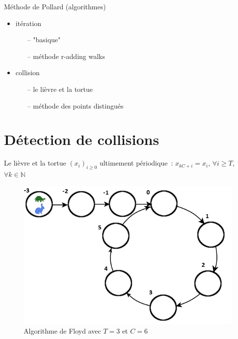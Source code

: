 \documentclass{beamer}
\begin{document}
  \begin{frame}{Méthode de Pollard (algorithmes)}
    \begin{itemize}
      \item itération
        \begin{itemize}
          \item[--] "basique"
          \item[--] méthode r-adding walks
        \end{itemize}
      \item collision
        \begin{itemize}
          \item[--] le lièvre et la tortue
          \item[--] méthode des points distingués
        \end{itemize}
    \end{itemize}
  \end{frame}


  \section{Détection de collisions}

  \begin{frame}{Le lièvre et la tortue}
    $(x_i)_{i \ge 0}$ ultimement périodique~: $x_{kC+i} = x_i$, $\forall i \geq T$, $\forall k \in \mathbb{N}$
    \begin{figure}
            \center{}
            \includegraphics[scale=0.5]{../rapport/images/Floyd.png}
            \caption{Algorithme de Floyd avec $T=3$ et $C=6$}
     \end{figure}
  \end{frame}
\end{document}
